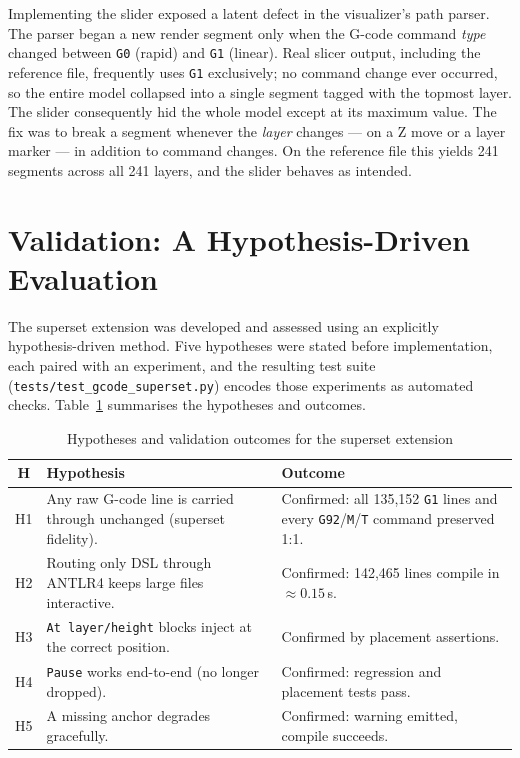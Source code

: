 Implementing the slider exposed a latent defect in the visualizer's path parser. The parser began a new render segment only when the G-code command \emph{type} changed between \texttt{G0} (rapid) and \texttt{G1} (linear). Real slicer output, including the reference file, frequently uses \texttt{G1} exclusively; no command change ever occurred, so the entire model collapsed into a single segment tagged with the topmost layer. The slider consequently hid the whole model except at its maximum value. The fix was to break a segment whenever the \emph{layer} changes --- on a Z move or a layer marker --- in addition to command changes. On the reference file this yields 241 segments across all 241 layers, and the slider behaves as intended.

\section{Validation: A Hypothesis-Driven Evaluation}
\label{sec:m3-validation}

The superset extension was developed and assessed using an explicitly hypothesis-driven method. Five hypotheses were stated before implementation, each paired with an experiment, and the resulting test suite (\texttt{tests/test\_gcode\_superset.py}) encodes those experiments as automated checks. Table~\ref{tab:m3-hypotheses} summarises the hypotheses and outcomes.

\begin{table}[H]
\centering
\begin{tabular}{|c|p{6.0cm}|p{4.6cm}|}
\hline
\textbf{H} & \textbf{Hypothesis} & \textbf{Outcome} \\
\hline
H1 & Any raw G-code line is carried through unchanged (superset fidelity). & Confirmed: all 135{,}152 \texttt{G1} lines and every \texttt{G92}/\texttt{M}/\texttt{T} command preserved 1:1. \\
\hline
H2 & Routing only DSL through ANTLR4 keeps large files interactive. & Confirmed: 142{,}465 lines compile in $\approx 0.15$\,s. \\
\hline
H3 & \texttt{At layer/height} blocks inject at the correct position. & Confirmed by placement assertions. \\
\hline
H4 & \texttt{Pause} works end-to-end (no longer dropped). & Confirmed: regression and placement tests pass. \\
\hline
H5 & A missing anchor degrades gracefully. & Confirmed: warning emitted, compile succeeds. \\
\hline
\end{tabular}
\caption{Hypotheses and validation outcomes for the superset extension}
\label{tab:m3-hypotheses}
\end{table}

